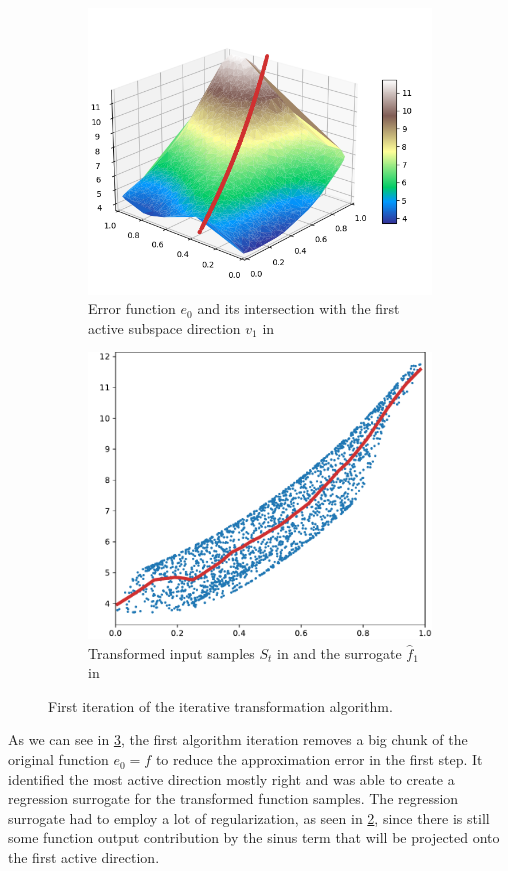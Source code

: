 \documentclass[
  a4paper,  %
  twoside,  %
  bibliography=totoc,
  headsepline,
  cleardoublepage=empty,
  parskip=half,
  draft=false
]{scrbook}
\begin{document}
\newpage
\begin{mdframed}[style=style]
\begin{figure}[H]
\begin{subfigure}{.5\textwidth}
  \centering
  \includegraphics[width=.85\linewidth]{graphics/pipeline_current_1.png}
  \caption{Error function $e_0$ and its intersection with the first active subspace direction $v_1$ in \reddot}
\label{fig:pipeline_current_1}
\end{subfigure}%
\begin{subfigure}{.5\textwidth}
  \centering
  \includegraphics[width=.85\linewidth]{graphics/pipeline_local_1}
  \caption{Transformed input samples $S_t$ in \darkblue and the surrogate $\hat{f}_1$ in \reddot}
\label{fig:pipeline_local_1}
\end{subfigure}
\delimit
\caption{First iteration of the iterative transformation algorithm.}
\label{fig:pipeline_1}
\end{figure}
\end{mdframed}
%
As we can see in \cref{fig:pipeline_1}, the first algorithm iteration removes a big chunk of the original function $e_0=f$ to reduce the approximation error in the first step.
It identified the most active direction mostly right and was able to create a regression surrogate for the transformed function samples.
The regression surrogate had to employ a lot of regularization, as seen in \cref{fig:pipeline_local_1}, since there is still some function output contribution by the sinus term that will be projected onto the first active direction.
\end{document}
